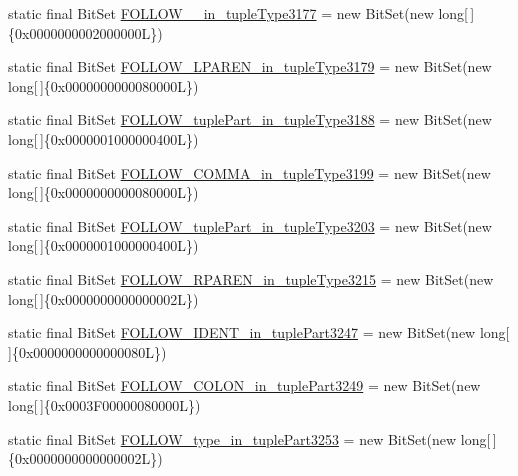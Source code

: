 \begin{DoxyCompactItemize}
\item 
static final Bit\-Set \hyperlink{classorg_1_1tzi_1_1use_1_1parser_1_1ocl_1_1_o_c_l_parser_ad37a12a26bdcc98911dc669eb5947683}{F\-O\-L\-L\-O\-W\-\_\-\_\-in\-\_\-tuple\-Type3177} = new Bit\-Set(new long\mbox{[}$\,$\mbox{]}\{0x0000000002000000\-L\})
\item 
static final Bit\-Set \hyperlink{classorg_1_1tzi_1_1use_1_1parser_1_1ocl_1_1_o_c_l_parser_a4bc2b022ea3bc31cb798b45bb78836bd}{F\-O\-L\-L\-O\-W\-\_\-\-L\-P\-A\-R\-E\-N\-\_\-in\-\_\-tuple\-Type3179} = new Bit\-Set(new long\mbox{[}$\,$\mbox{]}\{0x0000000000080000\-L\})
\item 
static final Bit\-Set \hyperlink{classorg_1_1tzi_1_1use_1_1parser_1_1ocl_1_1_o_c_l_parser_adec7c4d03b537b7ed6dceb3db56388b7}{F\-O\-L\-L\-O\-W\-\_\-tuple\-Part\-\_\-in\-\_\-tuple\-Type3188} = new Bit\-Set(new long\mbox{[}$\,$\mbox{]}\{0x0000001000000400\-L\})
\item 
static final Bit\-Set \hyperlink{classorg_1_1tzi_1_1use_1_1parser_1_1ocl_1_1_o_c_l_parser_a90395a9e0526d810a741e60b5fca8051}{F\-O\-L\-L\-O\-W\-\_\-\-C\-O\-M\-M\-A\-\_\-in\-\_\-tuple\-Type3199} = new Bit\-Set(new long\mbox{[}$\,$\mbox{]}\{0x0000000000080000\-L\})
\item 
static final Bit\-Set \hyperlink{classorg_1_1tzi_1_1use_1_1parser_1_1ocl_1_1_o_c_l_parser_a7bccbb26923ce69752153f54aea5dffa}{F\-O\-L\-L\-O\-W\-\_\-tuple\-Part\-\_\-in\-\_\-tuple\-Type3203} = new Bit\-Set(new long\mbox{[}$\,$\mbox{]}\{0x0000001000000400\-L\})
\item 
static final Bit\-Set \hyperlink{classorg_1_1tzi_1_1use_1_1parser_1_1ocl_1_1_o_c_l_parser_a00ca44b13fd9179b4c0152dbcd81e25d}{F\-O\-L\-L\-O\-W\-\_\-\-R\-P\-A\-R\-E\-N\-\_\-in\-\_\-tuple\-Type3215} = new Bit\-Set(new long\mbox{[}$\,$\mbox{]}\{0x0000000000000002\-L\})
\item 
static final Bit\-Set \hyperlink{classorg_1_1tzi_1_1use_1_1parser_1_1ocl_1_1_o_c_l_parser_a4f5975e6a2e051316569caa27ad91d7d}{F\-O\-L\-L\-O\-W\-\_\-\-I\-D\-E\-N\-T\-\_\-in\-\_\-tuple\-Part3247} = new Bit\-Set(new long\mbox{[}$\,$\mbox{]}\{0x0000000000000080\-L\})
\item 
static final Bit\-Set \hyperlink{classorg_1_1tzi_1_1use_1_1parser_1_1ocl_1_1_o_c_l_parser_af8ec8b2214610f52d3ff801887c8d71e}{F\-O\-L\-L\-O\-W\-\_\-\-C\-O\-L\-O\-N\-\_\-in\-\_\-tuple\-Part3249} = new Bit\-Set(new long\mbox{[}$\,$\mbox{]}\{0x0003\-F00000080000\-L\})
\item 
static final Bit\-Set \hyperlink{classorg_1_1tzi_1_1use_1_1parser_1_1ocl_1_1_o_c_l_parser_a47d12d18fe0f08c7e9c1b8e2cb4fcec4}{F\-O\-L\-L\-O\-W\-\_\-type\-\_\-in\-\_\-tuple\-Part3253} = new Bit\-Set(new long\mbox{[}$\,$\mbox{]}\{0x0000000000000002\-L\})

\end{DoxyCompactItemize}
